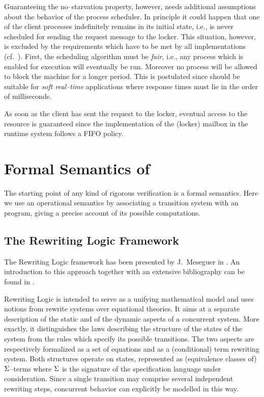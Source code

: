 \documentclass{entcs}
\begin{document}
Guaranteeing the no--starvation property, however, needs additional
assumptions about the behavior of the process scheduler. In principle it
could happen that one of the client processes indefinitely remains in its
initial state, i.e., is never scheduled for sending the request message to the
locker. This situation, however, is excluded by the requirements which have to
be met by all \Erlang implementations (cf.\ \cite[Sct.~5.6]{AVWW96}). First,
the scheduling algorithm must be \emph{fair}, i.e., any process which is
enabled for execution will eventually be run. Moreover no process will be
allowed to block the machine for a longer period. This is postulated since
\Erlang should be suitable for \emph{soft real--time} applications where
response times must lie in the order of milliseconds.

As soon as the client has sent the request to the locker, eventual access to
the resource is guaranteed since the implementation of the (locker) mailbox in
the \Erlang runtime system follows a FIFO policy.



\section{Formal Semantics of \Erlang}
\label{SctRL}

The starting point of any kind of rigorous verification is a formal
semantics. Here we use an operational semantics by associating a
transition system with an \Erlang program, giving a precise account of
its possible computations. 

\subsection{The Rewriting Logic Framework}

The Rewriting Logic framework has been presented by J.~Meseguer in
\cite{Mes92}. An introduction to this approach together with an extensive
bibliography can be found in \cite{MM02}. 

Rewriting Logic is intended to serve as a unifying mathematical model
and uses notions from rewrite systems over equational theories. It aims at a
separate description of the static and of the dynamic aspects of a concurrent
system. More exactly, it distinguishes the laws describing the structure of
the states of the system from the rules which specify its possible
transitions. The two aspects are respectively formalized as a set of equations
and as a (conditional) term rewriting system. Both structures operate on
states, represented as (equivalence classes of) $\Sigma$--terms where $\Sigma$ is
the signature of the specification language under consideration. Since a single
transition may comprise
several independent rewriting steps, concurrent behavior can explicitly be
modelled in this way.
\end{document}
